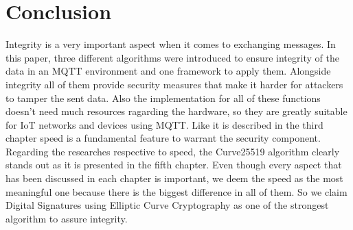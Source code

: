 \section{Conclusion}

Integrity is a very important aspect when it comes to exchanging messages. In this paper, three different algorithms were introduced to ensure integrity of the data in an MQTT environment and one framework to apply them. Alongside integrity all of them provide security measures that make it harder for attackers to tamper the sent data. Also the implementation for all of these functions doesn't need much resources ragarding the hardware, so they are greatly suitable for IoT networks and devices using MQTT. Like it is described in the third chapter speed is a fundamental feature to warrant the security component. Regarding the researches respective to speed, the Curve25519 algorithm clearly stands out as it is presented in the fifth chapter. Even though every aspect that has been discussed in each chapter is important, we deem the speed as the most meaningful one because there is the biggest difference in all of them. So we claim Digital Signatures using Elliptic Curve Cryptography as one of the strongest algorithm to assure integrity.

